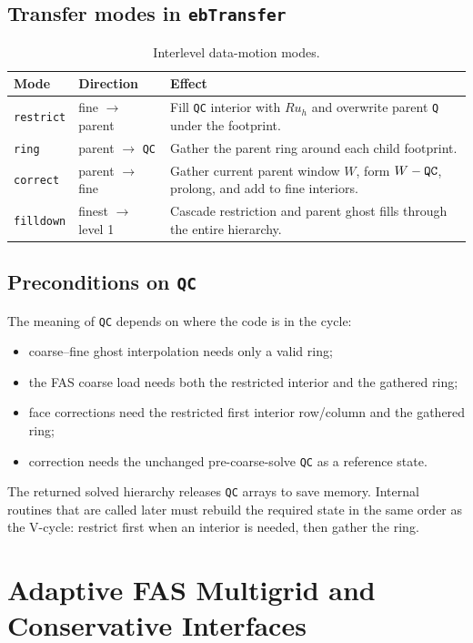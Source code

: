 \documentclass[11pt,oneside,openany]{book}
\newcommand{\code}[1]{\textnormal{\texttt{#1}}}
\begin{document}
\section{Transfer modes in \code{ebTransfer}}
\begin{table}[htbp]
\centering
\small
\begin{tabularx}{\textwidth}{@{}p{}p{}X@{}}
\toprule
Mode & Direction & Effect \\
\midrule
\code{restrict} & fine $\to$ parent & Fill \code{QC} interior with $Ru_h$ and overwrite parent \code{Q} under the footprint. \\
\code{ring} & parent $\to$ \code{QC} & Gather the parent ring around each child footprint. \\
\code{correct} & parent $\to$ fine & Gather current parent window $W$, form $W-\code{QC}$, prolong, and add to fine interiors. \\
\code{filldown} & finest $\to$ level 1 & Cascade restriction and parent ghost fills through the entire hierarchy. \\
\bottomrule
\end{tabularx}
\caption{Interlevel data-motion modes.}
\end{table}

\section{Preconditions on \code{QC}}
The meaning of \code{QC} depends on where the code is in the cycle:
\begin{itemize}
\item coarse--fine ghost interpolation needs only a valid ring;
\item the FAS coarse load needs both the restricted interior and the gathered ring;
\item face corrections need the restricted first interior row/column and the gathered ring;
\item correction needs the unchanged pre-coarse-solve \code{QC} as a reference state.
\end{itemize}
The returned solved hierarchy releases \code{QC} arrays to save memory. Internal routines that are called later must rebuild the required state in the same order as the V-cycle: restrict first when an interior is needed, then gather the ring.

\chapter{Adaptive FAS Multigrid and Conservative Interfaces}
\label{chap:fas}
\end{document}
